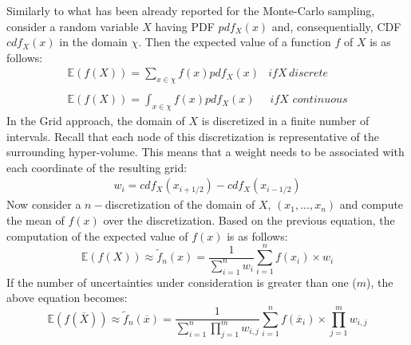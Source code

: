 Similarly to what has been already reported for the Monte-Carlo sampling, consider a random variable $X$ having PDF $pdf_{X}(x)$ and, consequentially, CDF $cdf_{X}(x)$ in the domain $\chi$. Then the expected value of a function $f$ of $X$ is as follows:
\begin{equation}
\begin{matrix}
\mathbb{E}(f(X)) =\sum_{x \in \chi} f(x)pdf_{X}(x) & if X \, discrete \\
\\
\mathbb{E}(f(X)) =\int_{x \in \chi} f(x)pdf_{X}(x) & \, if X \, \, continuous
\end{matrix}
\end{equation}
In the Grid approach, the domain of $X$ is discretized in a finite number of intervals. Recall that
each node of this discretization is representative of the surrounding hyper-volume. This means that a weight
needs to be associated with each coordinate of the resulting grid:
\begin{equation}
\begin{matrix}
  w_{i}= cdf_{X}(x_{i+1/2}) - cdf_{X}(x_{i-1/2})
\end{matrix}
\end{equation}
Now consider
a $n-$discretization of the domain of  $X$, $(x_{1},...,x_{n})$ and compute the mean of $f(x)$ over the discretization. Based on the previous equation, the computation of the expected value of $f(x)$ is as follows:
\begin{equation}
 \mathbb{E}(f(X)) \approx   \widetilde{f}_{n}(x) = \frac{1}{\sum_{i=1}^{n}w_{i}} \sum_{i=1}^{n} f(x_{i}) \times w_{i}
\end{equation}
If the number of uncertainties under consideration is greater than one ($m$), the above equation
becomes:
\begin{equation}
\mathbb{E}(f(\overline{X})) \approx   \widetilde{f}_{n}(\overline{x}) = \frac{1}{\sum_{i=1}^{n}\prod_{j=1}^{m}w_{i,j}} \sum_{i=1}^{n} f(\overline{x}_{i}) \times \prod_{j=1}^{m}w_{i,j}
\end{equation}

